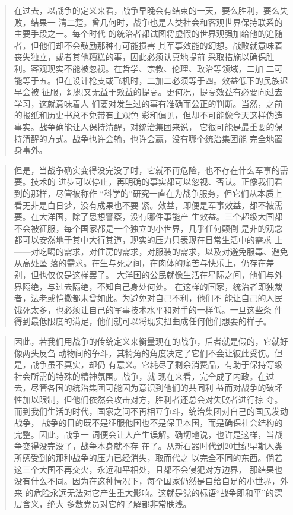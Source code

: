\begin{quotation}
在过去，以战争的定义来看，战争早晚会有结束的一天，要么胜利，要么失败，结果一
清二楚。曾几何时，战争也是人类社会和客观世界保持联系的主要手段之一。每个时代
的统治者都试图将虚假的世界观强加给他的追随者，但他们却不会鼓励那种有可能损害
其军事效能的幻想。战败就意味着丧失独立，或者其他糟糕的事，因此必须认真地提前
采取措施以确保胜利。客观现实不能被忽视。在哲学、宗教、伦理、政治等领域，二加
二可能等于五。但在设计枪支或飞机时，二加二必须等于四。效益低下的民族迟早会被
征服，幻想又无益于效益的提高。更何况，提高效益有必要向过去学习，这就意味着人
们要对发生过的事有准确而公正的判断。当然，之前的报纸和历史书总不免带有主观色
彩和偏见，但却不可能像今天这样伪造事实。战争确能让人保持清醒，对统治集团来说，
它很可能是最重要的保持清醒的方式。战争也许会输，也许会赢，没有哪个统治集团能
完全地置身事外。
\end{quotation}

\begin{quotation}
但是，当战争确实变得没完没了时，它就不再危险，也不存在什么军事的需要。技术的
进步可以停止，再明确的事实都可以忽视、否认。正像我们看到的那样，尽管被称作
``科学的''研究一直在为战争服务，但它们从本质上看无非是白日梦，没有成果也不要
紧。效益，即便是军事效益，都不被需要。在大洋国，除了思想警察，没有哪件事能产
生效益。三个超级大国都不会被征服，每个国家都是一个独立的小世界，几乎任何颠倒
是非的观念都可以安然地于其中大行其道，现实的压力只表现在日常生活中的需求
上——对吃喝的需求，对住房的需求，对服装的需求，以及对避免服毒、避免从高处坠
落的需求。在生与死之间，在肉体的痛苦与快乐上，仍存在差别，但也仅仅是这样罢了。
大洋国的公民就像生活在星际之间，他们与外界隔绝，与过去隔绝，不知自己身处何处。
在这样的国家，统治者即独裁者，法老或恺撒都未曾如此。为避免对自己不利，他们不
能让自己的人民饿死太多，也必须让自己的军事技术水平和对手的一样低。一旦这些条
件得到最低限度的满足，他们就可以将现实扭曲成任何他们想要的样子。
\end{quotation}

\begin{quotation}
因此，若我们用战争的传统定义来衡量现在的战争，后者就是假的，它就好像两头反刍
动物间的争斗，其犄角的角度决定了它们不会让彼此受伤。但是，战争虽不真实，却仍
有意义。它耗尽了剩余消费品，有助于保持等级社会所需的特殊的精神氛围。战争，就
现在来看，完全成了内政。在过去，尽管各国的统治集团可能因为意识到他们的共同利
益而对战争的破坏性加以限制，但他们依然会攻击对方，胜利者还总会对失败者进行掠
夺。而到我们生活的时代，国家之间不再相互争斗，统治集团对自己的国民发动战争，
战争的目的既不是征服他国也不是保卫本国，而是确保社会结构的完整。因此，战争一
词便会让人产生误解。确切地说，也许是这样，当战争变得没完没了，战争本身就不存
在了。从新石器时代到20世纪早期人类所感受到的那种战争的压力已经消失，取而代之
以完全不同的东西。倘若这三个大国不再交火，永远和平相处，且都不会侵犯对方边界，
那结果也没有什么不同。因为在这种情况下，每个国家仍然是自给自足的小世界，外来
的危险永远无法对它产生重大影响。这就是党的标语``战争即和平''的深层含义，绝大
多数党员对它的了解都非常肤浅。
\end{quotation}

